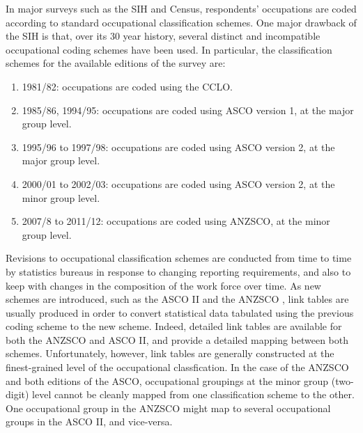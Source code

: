 In major surveys such as the SIH and Census, respondents' occupations are coded according to standard occupational classification schemes. One major drawback of the SIH is that, over its 30 year history, several distinct and incompatible occupational coding schemes have been used. In particular, the classification schemes for the available editions of the survey are:
\begin{enumerate}
\item 1981/82: occupations are coded using the CCLO.
\item 1985/86, 1994/95: occupations are coded using ASCO version 1, at the major group level.
\item 1995/96 to 1997/98: occupations are coded using ASCO version 2, at the major group level.
\item 2000/01 to 2002/03: occupations are coded using ASCO version 2, at the minor group level.
\item 2007/8 to 2011/12: occupations are coded using ANZSCO, at the minor group level.
\end{enumerate}
Revisions to occupational classification schemes are conducted from time to time by statistics bureaus in response to changing reporting requirements, and also to keep with changes in the composition of the work force over time. As new schemes are introduced, such as the ASCO II \citep{Castles1986} and the ANZSCO \citep{Trewin2006}, link tables are usually produced in order to convert statistical data tabulated using the previous coding scheme to the new scheme. Indeed, detailed link tables are available for both the ANZSCO and ASCO II, and provide a detailed mapping between both schemes. Unfortunately, however, link tables are generally constructed at the finest-grained level of the occupational classfication. In the case of the ANZSCO and both editions of the ASCO, occupational groupings at the minor group (two-digit) level cannot be cleanly mapped from one classification scheme to the other. One occupational group in the ANZSCO might map to several occupational groups in the ASCO II, and vice-versa.


